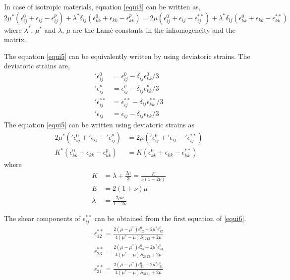 \documentclass[12pt, a4paper]{report}
\begin{document}
In case of isotropic materials, equation \ref{equi3} can be written as,
\begin{equation}
   2\mu^{*}(\epsilon_{ij}^{0} + \epsilon_{ij} - \epsilon_{ij}^{p}) +\lambda^{*}\delta_{ij}(\epsilon_{kk}^{0} + \epsilon_{kk} - \epsilon_{kk}^{p}) = 2\mu(\epsilon_{ij}^{0} + \epsilon_{ij} - \epsilon_{ij}^{**}) +\lambda^{*}\delta_{ij}(\epsilon_{kk}^{0} + \epsilon_{kk} - \epsilon_{kk}^{**})
   \label{equi5}
\end{equation}
where $\lambda^*$, $\mu^*$ and $\lambda$, $\mu$ are the Lamé constants in the inhomogeneity and the matrix.

The equation \ref{equi5} can be equivalently written by using deviatoric strains. The deviatoric strains are,
\begin{align}
    '\epsilon_{ij}^{0} &= \epsilon_{ij}^{0} - \delta_{ij}\epsilon_{kk}^{0}/3 \nonumber \\
    '\epsilon_{ij}^{p} &= \epsilon_{ij}^{p} - \delta_{ij}\epsilon_{kk}^{p}/3 \nonumber \\
    '\epsilon_{ij}^{**} &= \epsilon_{ij}^{**} - \delta_{ij}\epsilon_{kk}^{**}/3 \nonumber \\
    '\epsilon_{ij} &= \epsilon_{ij} - \delta_{ij}\epsilon_{kk}/3
\end{align}
The equation \ref{equi5} can be written using deviatoric strains as
\begin{align}
    2\mu^{*}('\epsilon_{ij}^{0} + '\epsilon_{ij} - '\epsilon_{ij}^{p}) &= 2\mu('\epsilon_{ij}^{0} + '\epsilon_{ij} - '\epsilon_{ij}^{**}) \nonumber \\
    K^{*}(\epsilon_{kk}^{0} + \epsilon_{kk} - \epsilon_{kk}^{p}) &= K(\epsilon_{kk}^{0} + \epsilon_{kk} - \epsilon_{kk}^{**})
    \label{equi6}
\end{align}
where
\begin{align}
    K &= \lambda + \frac{2\mu}{3} = \frac{E}{3(1 - 2\nu)} \nonumber \\
    E &= 2(1+\nu)\mu \nonumber \\
    \lambda &= \frac{2\mu\nu}{1-2\nu}
\end{align}

The shear components of $\epsilon^{**}_{ij}$ can be obtained from the first equation of \ref{equi6}.
\begin{align}
    \epsilon_{12}^{**} = \frac{2(\mu - \mu^{*})\epsilon_{12}^{0} + 2\mu^{*}\epsilon_{12}^{p}}{4(\mu^{*} - \mu)S_{1212} + 2\mu} \nonumber \\
    \epsilon_{23}^{**} = \frac{2(\mu - \mu^{*})\epsilon_{23}^{0} + 2\mu^{*}\epsilon_{23}^{p}}{4(\mu^{*} - \mu)S_{2323} + 2\mu} \nonumber \\
    \epsilon_{31}^{**} = \frac{2(\mu - \mu^{*})\epsilon_{31}^{0} + 2\mu^{*}\epsilon_{31}^{p}}{4(\mu^{*} - \mu)S_{3131} + 2\mu}
\end{align}
\end{document}
